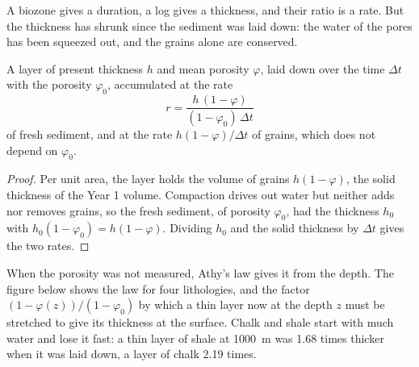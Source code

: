 A biozone gives a duration, a log gives a thickness, and their ratio is a rate. But the
thickness has shrunk since the sediment was laid down: the water of the pores has been squeezed
out, and the grains alone are conserved.

\begin{proposition}\label{prop:b2:palaeoenvironments:rate}
A layer of present thickness $h$ and mean porosity $\varphi$, laid down over the time $\Delta t$
with the porosity $\varphi_0$, accumulated at the rate
\[
  r = \frac{h\,(1 - \varphi)}{(1 - \varphi_0)\,\Delta t}
\]
of fresh sediment, and at the rate $h(1-\varphi)/\Delta t$ of grains, which does not depend on
$\varphi_0$.
\end{proposition}

\begin{proof}
Per unit area, the layer holds the volume of grains $h(1 - \varphi)$, the solid thickness of the
Year 1 volume. Compaction drives out water but neither adds nor removes grains, so the fresh
sediment, of porosity $\varphi_0$, had the thickness $h_0$ with $h_0(1 - \varphi_0) = h(1 -
\varphi)$. Dividing $h_0$ and the solid thickness by $\Delta t$ gives the two rates.
\end{proof}

When the porosity was not measured, Athy's law gives it from the depth. The figure below shows
the law for four lithologies, and the factor $(1 - \varphi(z))/(1 - \varphi_0)$ by which a thin
layer now at the depth $z$ must be stretched to give its thickness at the surface. Chalk and shale
start with much water and lose it fast: a thin layer of shale at \qty{1000}{m} was 1.68 times
thicker when it was laid down, a layer of chalk 2.19 times.

